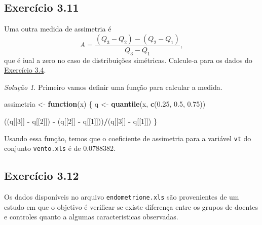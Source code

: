 \documentclass[
]{latex/krantz}
\newenvironment{Shaded}{\begin{snugshade}}{\end{snugshade}}
\newcommand{\ControlFlowTok}[1]{\textcolor[rgb]{0.13,0.29,0.53}{\textbf{#1}}}
\newcommand{\DecValTok}[1]{\textcolor[rgb]{0.00,0.00,0.81}{#1}}
\newcommand{\FloatTok}[1]{\textcolor[rgb]{0.00,0.00,0.81}{#1}}
\newcommand{\FunctionTok}[1]{\textcolor[rgb]{0.13,0.29,0.53}{\textbf{#1}}}
\newcommand{\NormalTok}[1]{#1}
\newcommand{\OtherTok}[1]{\textcolor[rgb]{0.56,0.35,0.01}{#1}}
\newcommand{\SpecialCharTok}[1]{\textcolor[rgb]{0.81,0.36,0.00}{\textbf{#1}}}
\theoremstyle{definition}
\theoremstyle{definition}
\theoremstyle{definition}
\theoremstyle{definition}
\theoremstyle{remark}
\newtheorem*{solution}{Solução}
\begin{document}
\hypertarget{exr3-11}{%
\subsection*{Exercício 3.11}\label{exr3-11}}

Uma outra medida de assimetria é \[ A = \frac{(Q_{3} - Q_{2}) - (Q_{2} - Q_{1})}{Q_{3} - Q_{1}},\] que é iual a zero no caso de distribuições simétricas. Calcule-a para os dados do \protect\hyperlink{exr3-4}{Exercício 3.4}.

\begin{solution}
Primeiro vamos definir uma função para calcular a medida.

\begin{Shaded}
\begin{Highlighting}[]
\NormalTok{assimetria }\OtherTok{\textless{}{-}} \ControlFlowTok{function}\NormalTok{(x) \{}
\NormalTok{  q }\OtherTok{\textless{}{-}} \FunctionTok{quantile}\NormalTok{(x, }\FunctionTok{c}\NormalTok{(}\FloatTok{0.25}\NormalTok{, }\FloatTok{0.5}\NormalTok{, }\FloatTok{0.75}\NormalTok{))}
  
\NormalTok{  ((q[[}\DecValTok{3}\NormalTok{]] }\SpecialCharTok{{-}}\NormalTok{ q[[}\DecValTok{2}\NormalTok{]]) }\SpecialCharTok{{-}}\NormalTok{ (q[[}\DecValTok{2}\NormalTok{]] }\SpecialCharTok{{-}}\NormalTok{ q[[}\DecValTok{1}\NormalTok{]]))}\SpecialCharTok{/}\NormalTok{(q[[}\DecValTok{3}\NormalTok{]] }\SpecialCharTok{{-}}\NormalTok{ q[[}\DecValTok{1}\NormalTok{]])}
\NormalTok{\}}
\end{Highlighting}
\end{Shaded}

Usando essa função, temos que o coeficiente de assimetria para a variável \texttt{vt} do conjunto \texttt{vento.xls} é de 0.0788382.
\end{solution}

\hypertarget{exr3-12}{%
\subsection*{Exercício 3.12}\label{exr3-12}}

Os dados disponíveis no arquivo \texttt{endometrione.xls} \citep{AbraoEtAl1997} são provenientes de um estudo em que o objetivo é verificar se existe diferença entre os grupos de doentes e controles quanto a algumas caracteristicas observadas.
\end{document}

